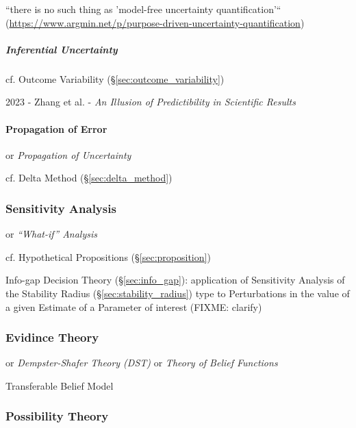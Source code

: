 ``there is no such thing as 'model-free uncertainty quantification'``
(\url{https://www.argmin.net/p/purpose-driven-uncertainty-quantification})



\subparagraph{Inferential Uncertainty}\label{sec:inferential_uncertainty}\hfill

cf. Outcome Variability (\S\ref{sec:outcome_variability})

2023 - Zhang et al. - \emph{An Illusion of Predictibility in Scientific Results}



\paragraph{Propagation of Error}\label{sec:error_propagation}\hfill

or \emph{Propagation of Uncertainty}

\fist cf. Delta Method (\S\ref{sec:delta_method})



\subsubsection{Sensitivity Analysis}\label{sec:sensitivity_analysis}

or \emph{``What-if'' Analysis}

cf. Hypothetical Propositions (\S\ref{sec:proposition})

\fist Info-gap Decision Theory (\S\ref{sec:info_gap}): application of
Sensitivity Analysis of the Stability Radius (\S\ref{sec:stability_radius}) type
to Perturbations in the value of a given Estimate of a Parameter of interest
(FIXME: clarify)



\subsubsection{Evidince Theory}\label{sec:evidence_theory}

or \emph{Dempster-Shafer Theory (DST)} or \emph{Theory of Belief Functions}

Transferable Belief Model



\subsubsection{Possibility Theory}\label{sec:possibility_theory}

